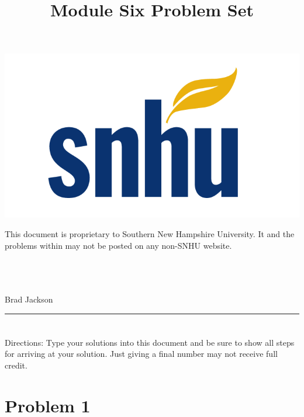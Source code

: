 \documentclass{amsart}
\theoremstyle{definition}
\theoremstyle{Exercise}
\theoremstyle{remark}
\theoremstyle{rule}
\numberwithin{equation}{section}
\begin{document}
\begin{center}
\includegraphics[scale=.1]{snhu_logo.png}
\end{center}
\title{\sf Module Six Problem Set}%



\maketitle
This document is proprietary to Southern New Hampshire University. It and the problems within may not be posted on any non-SNHU website.
\\\\\\\\
\begin{center}
Brad Jackson
\end{center}


\begin{center}
\rule{\textwidth}{0.4pt}
\end{center}
\newpage


\section*{}
\section*{}
Directions: Type your solutions into this document and be sure to show all steps for arriving at your solution. Just giving a final number may not receive full credit.
\\


\section*{Problem 1}
\end{document}
